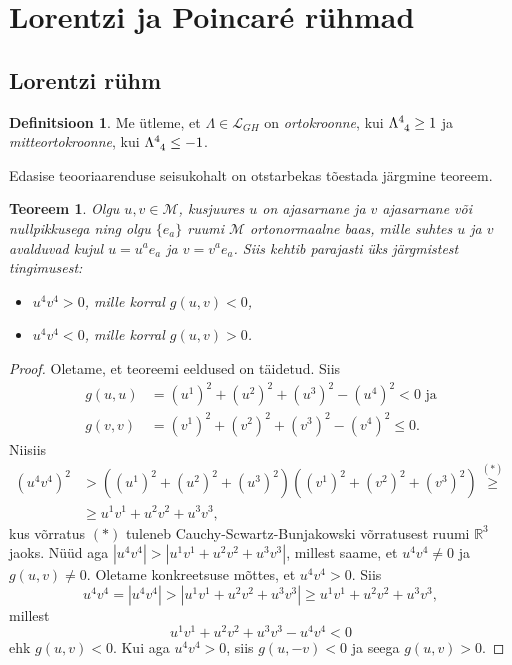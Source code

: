 \documentclass[a4paper,12pt]{article}
\theoremstyle{plain}
\newtheorem{teoreem}{Teoreem}[section]
\theoremstyle{definition}
\newtheorem{definitsioon}{Definitsioon}[section]
\numberwithin{equation}{section}
\def\R{{\mathbb R}}
\def\L{{\mathcal L}}
\def\M{{\mathcal M}}
\begin{document}
\newpage

\section{Lorentzi ja Poincar\'e rühmad}

\subsection{Lorentzi rühm}

\begin{definitsioon}
Me ütleme, et $\Lambda \in \L_{GH}$ on \emph{ortokroonne}, kui $\Lambda\indices{^4_4} \geq 1$ ja \emph{mitteortokroonne}, kui $\Lambda\indices{^4_4} \leq -1$.
\end{definitsioon}

Edasise teooriaarenduse seisukohalt on otstarbekas tõestada järgmine teoreem.
\begin{teoreem} \textnormal{\cite[teoreem 1.3.1]{Naber}} \label{teoreem:ajasarnased_vektorid}
Olgu $u, v \in \M$, kusjuures $u$ on ajasarnane ja $v$ ajasarnane või nullpikkusega ning olgu $\{e_a\}$ ruumi $\M$ ortonormaalne baas, mille suhtes $u$ ja $v$ avalduvad kujul $u = u^a e_a$ ja $v = v^a e_a$. Siis kehtib parajasti üks järgmistest tingimusest:
\begin{itemize}
\item[(a)] $u^4 v^4 > 0$, mille korral $g\left(u, v\right) < 0$,
\item[(b)] $u^4 v^4 < 0$, mille korral $g\left(u, v\right) > 0$.
\end{itemize}
\end{teoreem}
\begin{proof}
Oletame, et teoreemi eeldused on täidetud. Siis
\begin{align*}
g \left(u, u\right) &= \left(u^1\right)^2 + \left(u^2\right)^2 + \left(u^3\right)^2 - \left(u^4\right)^2 < 0 \text{ ja} \\
g \left(v, v\right) &= \left(v^1\right)^2 + \left(v^2\right)^2 + \left(v^3\right)^2 - \left(v^4\right)^2 \leq 0.
\end{align*}
Niisiis
\begin{align*}
\left(u^4 v^4\right)^2 &> \left( \left(u^1\right)^2 + \left(u^2\right)^2 + \left(u^3\right)^2 \right) \left( \left(v^1\right)^2 + \left(v^2\right)^2 + \left(v^3\right)^2 \right) \overset{(*)}{\geq} \\
&\geq u^1 v^1 + u^2 v^2 + u^3 v^3,
\end{align*}
kus võrratus $(*)$ tuleneb Cauchy-Scwartz-Bunjakowski võrratusest ruumi $\R^3$ jaoks.
Nüüd aga $|u^4 v^4| > |u^1 v^1 + u^2 v^2 + u^3 v^3|$, millest saame, et $u^4 v^4 \neq 0$ ja $g\left (u, v\right ) \neq 0$.
Oletame konkreetsuse mõttes, et $u^4 v^4 > 0$. Siis
\[u^4 v^4 = |u^4 v^4| > |u^1 v^1 + u^2 v^2 + u^3 v^3| \geq u^1 v^1 + u^2 v^2 + u^3 v^3,\]
millest
\[u^1 v^1 + u^2 v^2 + u^3 v^3 - u^4 v^4 < 0\]
ehk $g\left (u, v\right ) < 0$.
Kui aga $u^4 v^4 > 0$, siis $g\left (u, -v\right ) < 0$ ja seega $g \left (u, v\right ) > 0$.
\end{proof}
\end{document}
